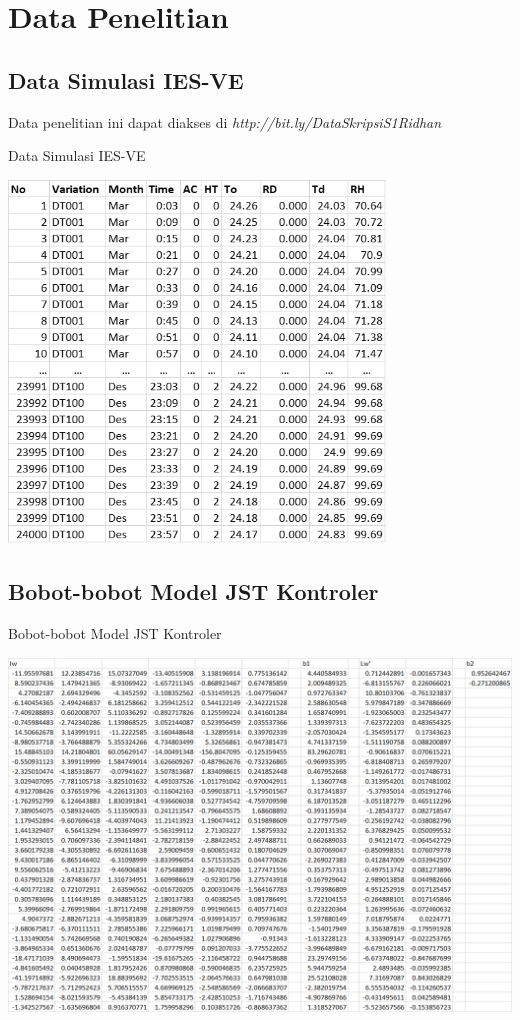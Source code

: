 \chapter{Data Penelitian}

\section{Data Simulasi IES-VE}
Data penelitian ini dapat diakses di \textit{http://bit.ly/DataSkripsiS1Ridhan}

\begin{table}[!h]
	\caption{Data Simulasi IES-VE}
	\label{tbl:A:DataSkripsiRidhan}
	\centering
	\includegraphics[width=0.75\textwidth]{figures/DataSkripsiRidhan}
\end{table}
\vspace{3em}
\break
\break

\section{Bobot-bobot Model JST Kontroler}
\begin{table}[!h]
	\caption{Bobot-bobot Model JST Kontroler}
	\label{tbl:A:BobotKontroler}
	\centering
	\includegraphics[width=1\textwidth]{figures/BobotKontroler}
\end{table}
\vspace{1em}
\break

